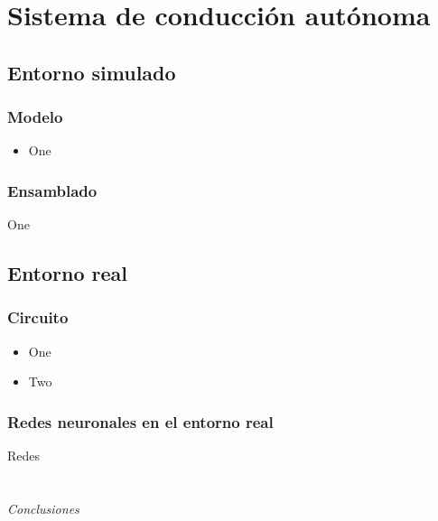 \documentclass{beamer}
\makeatletter
\newenvironment{conditions*}
{\par\vspace{\abovedisplayskip}\noindent
\tabularx{\columnwidth}{>{$}l<{$} @{\ : } >{\raggedright\arraybackslash}X}}
{\endtabularx\par\vspace{\belowdisplayskip}}
\makeatother
\begin{document}
\section{Sistema de conducción autónoma}
\subsection{Entorno simulado}
\begin{frame}
	\frametitle{Modelo}
	\begin{itemize}
		\item One
	\end{itemize}
\end{frame}

\begin{frame}
	\frametitle{Ensamblado}
	\begin{outline}
		\1 One
	\end{outline}
\end{frame}

\subsection{Entorno real}
\begin{frame}
	\frametitle{Circuito}
	\begin{itemize}
		\item One
		\item Two
	\end{itemize}
\end{frame}

\begin{frame}
	\frametitle{Redes neuronales en el entorno real}
	\begin{outline}
		\1 Redes
	\end{outline}
\end{frame}



\section*{}
\begin{frame}{}
	\centering \Huge
	\emph{Conclusiones}
\end{frame}
\end{document}
